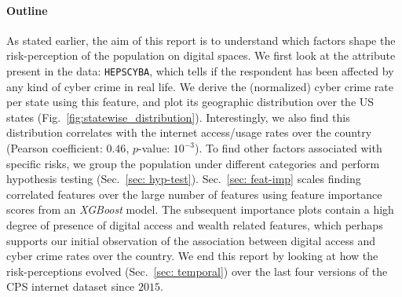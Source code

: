 \documentclass{article}
\theoremstyle{plain}
\theoremstyle{definition}
\theoremstyle{remark}
\begin{document}
\paragraph{Outline} 
As stated earlier, the aim of this report is to understand which factors shape the risk-perception of the population on digital spaces. We first look at the attribute present in the data: \texttt{HEPSCYBA}, which tells if the respondent has been affected by any kind of cyber crime in real life. We derive the (normalized) cyber crime rate per state using this feature, and plot its geographic distribution over the US states (Fig.~\ref{fig:statewise_distribution}). Interestingly, we also find this distribution correlates  with the internet access/usage rates over the country (Pearson coefficient: $0.46$, $p$-value: $10^{-3}$). To find other factors associated with specific risks, we group the population under different categories and perform hypothesis testing (Sec.~\ref{sec: hyp-test}).
Sec.~\ref{sec: feat-imp} scales finding correlated features over the large number of features using feature importance scores from an \emph{XGBoost} model.
The subsequent importance plots contain a high degree of presence of digital access and wealth related features, which perhaps supports our initial observation of the association between digital access and cyber crime rates over the country. We end this report by looking at how the risk-perceptions evolved (Sec.~\ref{sec: temporal}) over the last four versions of the CPS internet dataset since $2015$.
\end{document}
